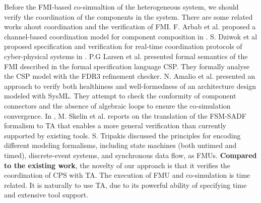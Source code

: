 Before the FMI-based co-simualtion of the heterogeneous system, we should verify the coordination of the components in the system. There are some related works ahout coordination and the verification of FMI. F. Arbab et al. proposed a channel-based coordination model for component composition in \cite{Arbab2002Reo}. S. Dziwok et al proposed specification and verification for real-time coordination protocols of cyber-physical systems in \cite{Dziwok17}. P.G Larsen et al. \cite{Larsen2016Integrated} presented formal semantics of the FMI described in the formal specification language CSP. They formally analyse the CSP model with the FDR3 refinement checker. N. Amalio et al. \cite{AmalioPCW16} presented an approach to verify both healthiness and well-formedness of an architecture design modeled with SysML. They attempt to check the conformity of component connectors and the absence of algebraic loops to ensure the co-simulation convergence.
In \cite{SkelinWOHL15}, M. Skelin et al. reports on the translation of the FSM-SADF formalism to TA that enables a more general verification than currently supported by existing tools. S. Tripakis \cite{Tripakis15} discussed the principles for encoding different modeling formalisms, including state machines (both untimed and timed), discrete-event systems, and synchronous data flow, as FMUs. 
\textbf{Compared to the existing work}, the novelty of our approach is that it verifies the coordination of CPS with TA. The execution of FMU and co-simulation is time related. It is naturally to use TA, due to its powerful ability of specifying time and extensive tool support.


